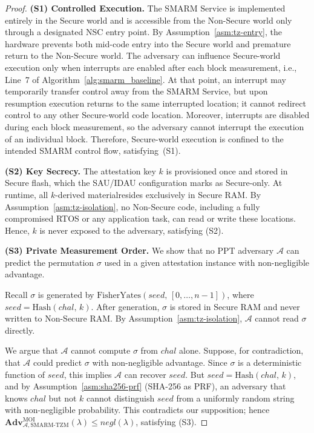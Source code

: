 \documentclass{ieeeaccess}
\newcommand{\Adv}{\mathbf{Adv}}
\begin{document}
 
\begin{proof}


\textbf{(S1) Controlled Execution.}
The SMARM Service is implemented entirely in the Secure world and is accessible from the Non-Secure world only through a designated NSC entry point.
By Assumption~\ref{asm:tz-entry}, the hardware prevents both mid-code entry into the Secure world and premature return to the Non-Secure world.
The adversary can influence Secure-world execution only when interrupts are enabled after each block measurement, i.e., Line~7 of Algorithm~\ref{alg:smarm_baseline}.
At that point, an interrupt may temporarily transfer control away from the SMARM Service, but upon resumption execution returns to the same interrupted location; it cannot redirect control to any other Secure-world code location.
Moreover, interrupts are disabled during each block measurement, so the adversary cannot interrupt the execution of an individual block.
Therefore, Secure-world execution is confined to the intended SMARM control flow, satisfying~(S1).
 
\medskip
\noindent\textbf{(S2) Key Secrecy.}
The attestation key $k$ is provisioned once and stored in Secure flash,
which the SAU/IDAU configuration marks as Secure-only.
At runtime, all $k$-derived materialresides exclusively in Secure RAM.
By Assumption~\ref{asm:tz-isolation}, no Non-Secure code, including a
fully compromised RTOS or any application task, can read or write these locations.
Hence, $k$ is never exposed to the adversary, satisfying (S2).
 
\medskip
\noindent\textbf{(S3) Private Measurement Order.}
We show that no PPT adversary $\mathcal{A}$ can predict the permutation
$\sigma$ used in a given attestation instance with non-negligible advantage.
 
Recall $\sigma$ is generated by $\mathrm{FisherYates}(\mathit{seed},\, [0,\dots,n-1])$, where $\mathit{seed} = \mathrm{Hash}(\mathit{chal},\,k)$.
After generation, $\sigma$ is stored in Secure RAM and never written to
Non-Secure RAM.
By Assumption~\ref{asm:tz-isolation}, $\mathcal{A}$ cannot read $\sigma$ directly.
 
We argue that $\mathcal{A}$ cannot compute $\sigma$ from $\mathit{chal}$
alone.
Suppose, for contradiction, that $\mathcal{A}$ could predict $\sigma$ with
non-negligible advantage.
Since $\sigma$ is a deterministic function of $\mathit{seed}$, this implies
$\mathcal{A}$ can recover $\mathit{seed}$.
But $\mathit{seed} = \mathrm{Hash}(\mathit{chal},\,k)$, and by
Assumption~\ref{asm:sha256-prf} (SHA-256 as PRF), an adversary that knows
$\mathit{chal}$ but not $k$ cannot distinguish $\mathit{seed}$ from a
uniformly random string with non-negligible probability.
This contradicts our supposition; hence
$\Adv^{\mathrm{MOI}}_{\mathcal{A}, \text{SMARM-TZM}}(\lambda) \leq \mathit{negl}(\lambda)$,
satisfying (S3).
 
\end{proof}
 
\end{document}
